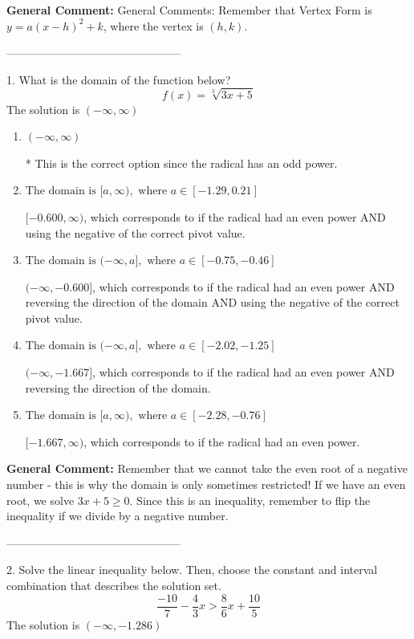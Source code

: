 \documentclass{extbook}[14pt]
\begin{document}
\textbf{General Comment:} General Comments: Remember that Vertex Form is $y = a(x-h)^2+k$, where the vertex is $(h, k)$. 

-----------------------------------------------

1. What is the domain of the function below?
\[ f(x) = \sqrt[3]{3 x + 5} \] 
The solution is $ (-\infty, \infty) $ 

\begin{enumerate}[label=\Alph*.] 
\item $ (-\infty, \infty) $ 

 * This is the correct option since the radical has an odd power. 
\item $ \text{The domain is } [a, \infty), \text{   where } a \in [-1.29, 0.21] $ 

 $[-0.600, \infty)$, which corresponds to if the radical had an even power AND using the negative of the correct pivot value. 
\item $ \text{The domain is } (-\infty, a], \text{   where } a \in [-0.75, -0.46] $ 

 $(-\infty, -0.600]$, which corresponds to if the radical had an even power AND reversing the direction of the domain AND using the negative of the correct pivot value. 
\item $ \text{The domain is } (-\infty, a], \text{   where } a \in [-2.02, -1.25] $ 

 $(-\infty, -1.667]$, which corresponds to if the radical had an even power AND reversing the direction of the domain. 
\item $ \text{The domain is } [a, \infty), \text{   where } a \in [-2.28, -0.76] $ 

 $[-1.667, \infty)$, which corresponds to if the radical had an even power. 
\end{enumerate} 
 
\textbf{General Comment:} Remember that we cannot take the even root of a negative number - this is why the domain is only sometimes restricted! If we have an even root, we solve $3 x + 5 \geq 0$. Since this is an inequality, remember to flip the inequality if we divide by a negative number. 

-----------------------------------------------

2. Solve the linear inequality below. Then, choose the constant and interval combination that describes the solution set.
\[ \frac{-10}{7} - \frac{4}{3} x > \frac{8}{6} x + \frac{10}{5} \] 
The solution is $ (-\infty, -1.286) $ 
\end{document}
